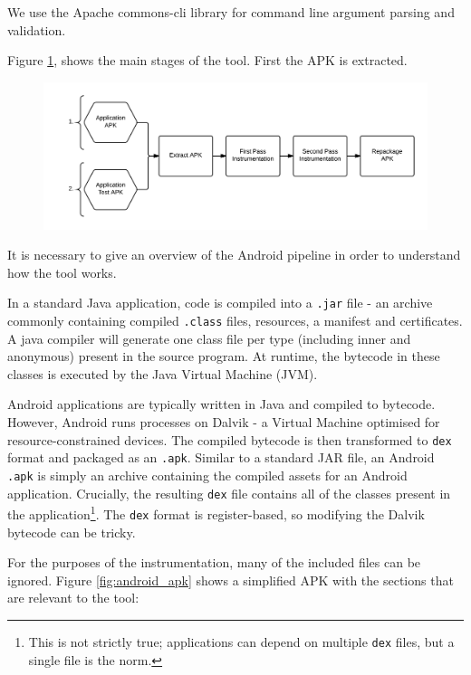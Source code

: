 We use the Apache commons-cli library for command line argument parsing and validation.

Figure \ref{fig:instrumenting_apk}, shows the main stages of the tool. First the APK is extracted.

\begin{figure}[h]
\includegraphics[width=\linewidth]{images/instrumenting_apk}
\caption{}
\label{fig:instrumenting_apk}
\end{figure}

It is necessary to give an overview of the Android pipeline in order to understand how the tool works.

In a standard Java application, code is compiled into a {\tt .jar} file - an archive commonly containing compiled {\tt .class} files, resources, a manifest and certificates. A java compiler will generate one class file per type (including inner and anonymous) present in the source program. At runtime, the bytecode in these classes is executed by the Java Virtual Machine (JVM).

Android applications are typically written in Java and compiled to bytecode. However, Android runs processes on Dalvik - a Virtual Machine optimised for resource-constrained devices. The compiled bytecode is then transformed to {\tt dex} format and packaged as an {\tt .apk}. Similar to a standard JAR file, an Android {\tt .apk} is simply an archive containing the compiled assets for an Android application. Crucially, the resulting {\tt dex} file contains all of the classes present in the application\footnote{This is not strictly true; applications can depend on multiple {\tt dex} files, but a single file is the norm.}. The {\tt dex} format is register-based, so modifying the Dalvik bytecode can be tricky.


For the purposes of the instrumentation, many of the included files can be ignored. Figure \ref{fig:android_apk} shows a simplified APK with the sections that are relevant to the tool:

